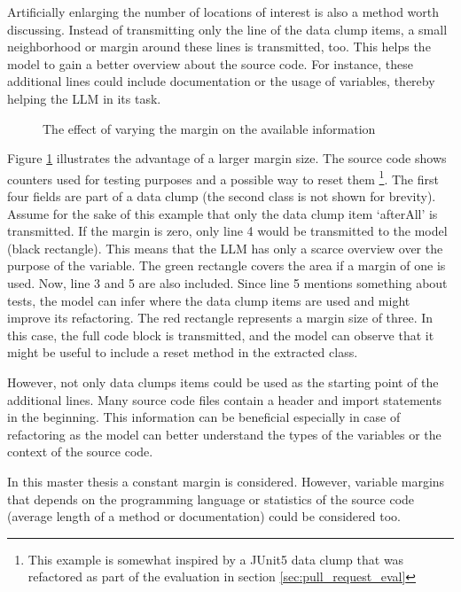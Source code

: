 Artificially enlarging the number of locations of interest is also a method worth discussing. Instead of transmitting only the line of the data clump items,  a small neighborhood or margin around these lines is transmitted, too. This helps the model to gain a better overview about the source code. For instance, these additional lines could include documentation or the usage of variables, thereby helping the \ac{LLM} in its task.

\begin{figure}
    \centering
    
    \caption{The effect of varying the margin on the available information}
    \label{fig:margin_effect}
\end{figure}

Figure \ref{fig:margin_effect} illustrates the advantage of a larger margin size. The source code shows counters used for testing purposes and a possible way to reset them \footnote{This example is somewhat inspired by a JUnit5 data clump that was refactored as part of the evaluation in section \ref{sec:pull_request_eval}}. The first four fields are part of a data clump (the second class is not shown for brevity). Assume for the sake of this example that only the data clump item \enquote*{afterAll} is transmitted. If the margin is zero, only line 4 would be transmitted to the model (black rectangle). This means that the \ac{LLM} has only a scarce overview over the purpose of the variable.
The green rectangle covers the area if a margin of one is used. Now, line 3 and 5 are also included. Since line 5 mentions something about tests, the model can infer where the data clump items are used and might improve its refactoring. The red rectangle represents a margin size of three. In this case, the full code block is transmitted, and the model can observe that it might be useful to include a reset method in the extracted class. 

However, not only data clumps items could be used as the starting point of the additional lines. Many source code files contain a header and import statements in the beginning. This information can be beneficial especially in case of refactoring as the model can better understand the types of the variables or the context of the source code.

In this master thesis a constant margin is considered. However, variable margins that depends on the programming language or statistics of the source code (average length of a method or documentation) could be considered too.


